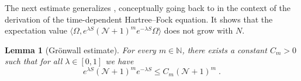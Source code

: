 \documentclass[12pt,a4paper]{article}
\numberwithin{equation}{section}
\newcommand{\NNN}{\mathbb{N}}
\newcommand{\1}{\mathbb{I}}
\newcommand{\HS}{\mathrm{HS}}
\newcommand{\Zstar}{\mathbb{Z}^3} %
\newcommand{\Z}{\mathbb{Z}}
\newcommand{\NN}{\mathcal{N}}
\theoremstyle{plain}
\newtheorem{lemma}[theorem]{Lemma}
\theoremstyle{definition}
\theoremstyle{remark}
\theoremstyle{plain}
\theoremstyle{definition}
\theoremstyle{remark}
\begin{document}
The next estimate generalizes \cite[Prop.~5.8]{CHN21}, conceptually going back to \cite{BJPSS16,BPS14} in the context of the derivation of the time-dependent Hartree--Fock equation. It shows that the expectation value $ \langle \Omega, e^{\lambda S} (\mathcal{N} + 1)^m e^{-\lambda S} \Omega \rangle$ does not grow with $N$.

\begin{lemma}[Gr\"onwall estimate]\label{lem:gronNest}
For every $ m \in \NNN $, there exists a constant $ C_m > 0 $ such that for all $ \lambda\in [0,1]$ we have
\begin{equation}\label{eq:gronest}
	e^{\lambda S} (\mathcal{N} +1)^m e^{-\lambda S}
	\leq C_m (\NN+1)^m \;.
\end{equation}
\end{lemma}
\end{document}
